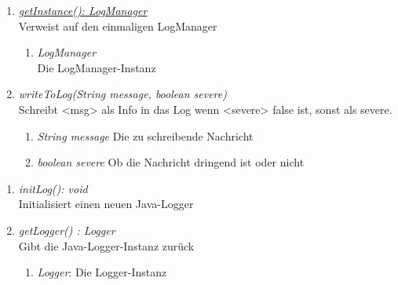 \begin{enumerate}[+]

	\item \underline{\textit{getInstance(): LogManager}} \\
	Verweist auf den einmaligen LogManager
	
	\vspace{-0.2cm}
	\begin{enumerate}[$\circ$]
		\item \textit{LogManager} \\
		Die LogManager-Instanz
	\end{enumerate}

	\item \textit{writeToLog(String message, boolean severe)} \\
	Schreibt <msg> als Info in das Log wenn <severe> false ist, sonst als severe.
	\begin{enumerate}[$\bullet$]
		\item \textit{String message} Die zu schreibende Nachricht
		\item \textit{boolean severe} Ob die Nachricht dringend ist oder nicht
	\end{enumerate}
\end{enumerate}


\begin{enumerate}[$-$]

	\item \textit{initLog(): void} \\ Initialisiert einen neuen Java-Logger
	\vspace{-0.2cm}

	\item \textit{getLogger() : Logger} \\
	Gibt die Java-Logger-Instanz zurück
	\begin{enumerate}[$\circ$]
		\item \textit{Logger}: Die Logger-Instanz
	\end{enumerate}
\end{enumerate}
	